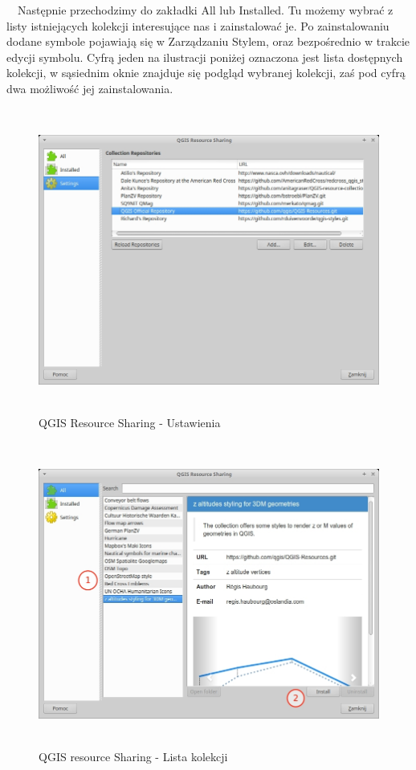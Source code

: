 \documentclass[12pt,a4paper]{book}
\begin{document}
\ \ Następnie przechodzimy do zakładki All lub Installed. Tu możemy wybrać z listy istniejących kolekcji interesujące nas i zainstalować je. Po zainstalowaniu dodane symbole pojawiają się w Zarządzaniu Stylem, oraz bezpośrednio w trakcie edycji symbolu.  Cyfrą jeden na ilustracji poniżej oznaczona jest lista dostępnych kolekcji, w sąsiednim oknie znajduje się podgląd wybranej kolekcji, zaś pod cyfrą dwa możliwość jej zainstalowania.
\begin{figure}[!ht]
	\centering
	\includegraphics[height=10cm]{007-qrs-u.jpg}
	\caption{QGIS Resource Sharing - Ustawienia}
\end{figure}
\begin{figure}[!ht]
	\centering
	\includegraphics[height=10cm]{007-qrs-kolekcje.jpg}
	\caption{QGIS resource Sharing - Lista kolekcji}
\end{figure}
\end{document}
